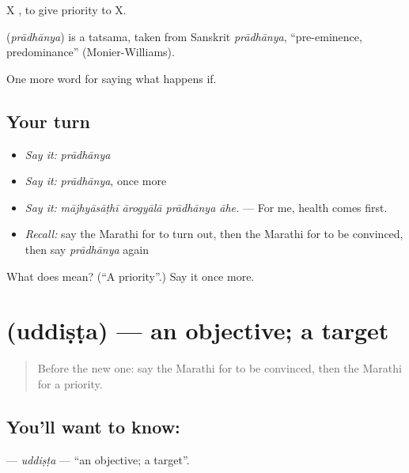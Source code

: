 X   , to give priority to X.

\begin{cousinweb}
\textbf{} (\emph{prādhānya}) is a tatsama, taken from Sanskrit \emph{prādhānya}, \textquotedblleft{}pre-eminence, predominance\textquotedblright{} (Monier-Williams).
\end{cousinweb}

\begin{grammarlens}[title={What you've built}]
One more word for saying what happens if.
\end{grammarlens}

\subsection*{Your turn}
\begin{itemize}
\raggedright
  \item \emph{Say it:} \emph{prādhānya}
  \item \emph{Say it:} \emph{prādhānya}, once more
  \item \emph{Say it:} \emph{mājhyāsāṭhī ārogyālā prādhānya āhe.} — For me, health comes first.
  \item \emph{Recall:} say the Marathi for to turn out, then the Marathi for to be convinced, then say \emph{prādhānya} again
\end{itemize}

\begin{tcolorbox}[breakable,colback=teal!4,colframe=teal!35!black,title={Before you move on}]
What does  mean? (\textquotedblleft{}A priority\textquotedblright{}.) Say it once more.
\end{tcolorbox}
\section[\texorpdfstring{\mr{उद्दिष्ट} (uddiṣṭa)}{उद्दिष्ट (uddiṣṭa)}]{ (uddiṣṭa) — an objective; a target}

\label{lesson:MR-C388-uddista}



\begin{quote}
Before the new one: say the Marathi for to be convinced, then the Marathi for a priority.
\end{quote}

\subsection*{You'll want to know: }
\textbf{} — \emph{uddiṣṭa} — \textquotedblleft{}an objective; a target\textquotedblright{}.

